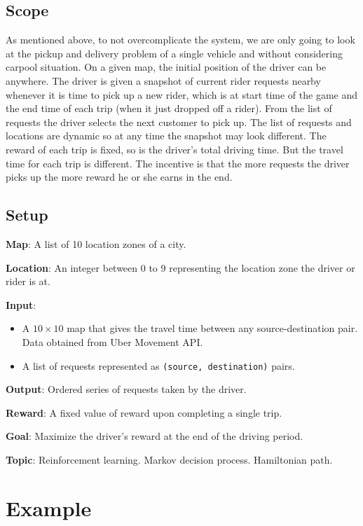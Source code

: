 \documentclass{article}
\begin{document}
\subsection{Scope} As mentioned above, to not overcomplicate the system, we are only going to look at the pickup and delivery problem of a single vehicle and without considering carpool situation. On a given map, the initial position of the driver can be anywhere. The driver is given a snapshot of current rider requests nearby whenever it is time to pick up a new rider, which is at start time of the game and the end time of each trip (when it just dropped off a rider). From the list of requests the driver selects the next customer to pick up. The list of requests and locations are dynamic so at any time the snapshot may look different. The reward of each trip is fixed, so is the driver's total driving time. But the travel time for each trip is different. The incentive is that the more requests the driver picks up the more reward he or she earns in the end.

\subsection{Setup}
\noindent\textbf{Map}: A list of 10 location zones of a city.

\noindent\textbf{Location}: An integer between 0 to 9 representing the location zone the driver or rider is at.

\noindent\textbf{Input}:
\begin{itemize}
\item A $10\times 10$ map that gives the travel time between any source-destination pair. Data obtained from Uber Movement API.
\item A list of requests represented as \texttt{(source, destination)} pairs.
\end{itemize}

\noindent\textbf{Output}: Ordered series of requests taken by the driver.

\noindent\textbf{Reward}: A fixed value of reward upon completing a single trip.

\noindent\textbf{Goal}: Maximize the driver’s reward at the end of the driving period.

\noindent\textbf{Topic}: Reinforcement learning. Markov decision process. Hamiltonian path.

\section{Example}
\end{document}
